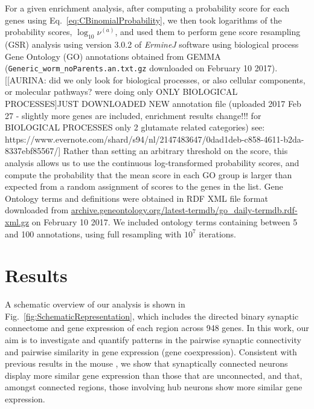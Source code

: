 \documentclass[10pt,letterpaper]{article}
\begin{document}
For a given enrichment analysis, after computing a probability score for each genes using Eq.~\eqref{eq:CBinomialProbability}, we then took logarithms of the probability scores, $\log_{10}\nu^{(a)}$, and used them to perform gene score resampling (GSR) analysis using version 3.0.2 of \emph{ErmineJ} software \cite{Gillis2010} using biological process Gene Ontology (GO) annotations \cite{Ashburner2000} obtained from GEMMA \cite{Zoubarev2012} (\texttt{Generic\_worm\_noParents.an.txt.gz} downloaded on February 10 2017).
[[AURINA: did we only look for biological processes, or also cellular components, or molecular pathways? were doing only ONLY BIOLOGICAL PROCESSES]JUST DOWNLOADED NEW annotation file (uploaded 2017 Feb 27 - slightly more genes are included, enrichment results change!!! for BIOLOGICAL PROCESSES only 2 glutamate related categories) see: https://www.evernote.com/shard/s94/nl/2147483647/0dad1deb-c858-4611-b2da-8337ebf85567/]
Rather than setting an arbitrary threshold on the score, this analysis allows us to use the continuous log-transformed probability scores, and compute the probability that the mean score in each GO group is larger than expected from a random assignment of scores to the genes in the list.
Gene Ontology terms and definitions were obtained in RDF XML file format downloaded from \url{archive.geneontology.org/latest-termdb/go_daily-termdb.rdf-xml.gz} on February 10 2017.
We included ontology terms containing between 5 and 100 annotations, using full resampling with $10^{7}$ iterations.


\section*{Results}

A schematic overview of our analysis is shown in Fig.~\ref{fig:SchematicRepresentation}, which includes the directed binary synaptic connectome and gene expression of each region across 948 genes.
In this work, our aim is to investigate and quantify patterns in the pairwise synaptic connectivity and pairwise similarity in gene expression (gene coexpression).
Consistent with previous results in the mouse \cite{Fulcher:2016ck}, we show that synaptically connected neurons display more similar gene expression than those that are unconnected, and that, amongst connected regions, those involving hub neurons show more similar gene expression.
\end{document}
